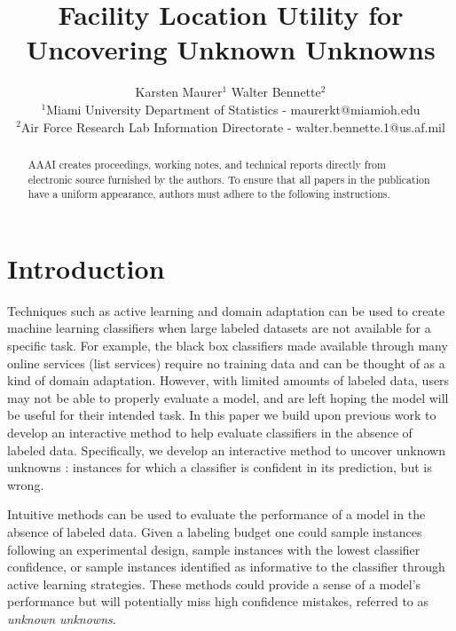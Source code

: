 \documentclass[letterpaper]{article} %
\begin{document}
%
\title{Facility Location Utility for Uncovering Unknown Unknowns}
\author{Karsten Maurer$^1$ \hspace{.2in} Walter Bennette$^2$\\
$^1$Miami University Department of Statistics - maurerkt@miamioh.edu\\ 
$^2$Air Force Research Lab Information Directorate - walter.bennette.1@us.af.mil \\
}

\maketitle
\begin{abstract}
AAAI creates proceedings, working notes, and technical reports directly from electronic source furnished by the authors. To ensure that all papers in the publication have a uniform appearance, authors must adhere to the following instructions. 
\end{abstract}

\section{Introduction}

Techniques such as active learning \citep{Settles2010} and domain adaptation \citep{Patel2014} can be used to create machine learning classifiers when large labeled datasets are not available for a specific task.  For example, the black box classifiers made available through many online services (list services) require no training data and can be thought of as a kind of domain adaptation.  However, with limited amounts of labeled data, users may not be able to properly evaluate a model, and are left hoping the model will be useful for their intended task.  In this paper we build upon previous work to develop an interactive method to help evaluate classifiers in the absence of labeled data.  Specifically, we develop an interactive method to uncover unknown unknowns \citep{Attenberg2015}: instances for which a classifier is confident in its prediction, but is wrong.  

Intuitive methods can be used to evaluate the performance of a model in the absence of labeled data.  Given a labeling budget one could sample instances following an experimental design, sample instances with the lowest classifier confidence, or sample instances identified as informative to the classifier through active learning strategies.  These methods could provide a sense of a model's performance but will potentially miss high confidence mistakes, referred to as \textit{unknown unknowns}.     
\end{document}
